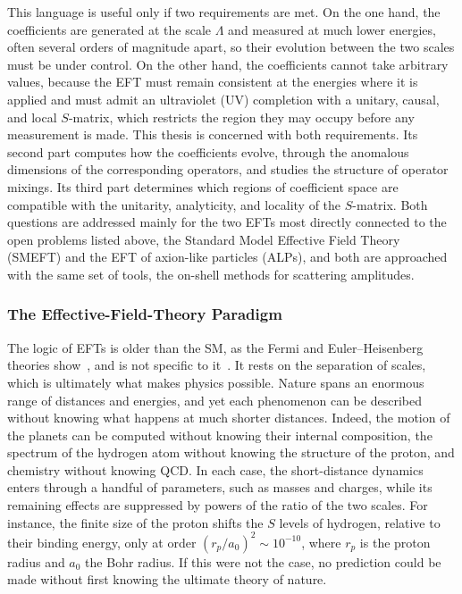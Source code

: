 This language is useful only if two requirements are met. On the one hand, the coefficients are
generated at the scale $\Lambda$ and measured at much lower energies, often several orders of
magnitude apart, so their evolution between the two scales must be under control. On the other hand,
the coefficients cannot take arbitrary values, because the EFT must remain consistent at the
energies where it is applied and must admit an ultraviolet (UV) completion with a unitary, causal, and local
$S$-matrix, which restricts the region they may occupy before any measurement is made. This thesis
is concerned with both requirements. Its second part computes how the coefficients evolve, through
the anomalous dimensions of the corresponding operators, and studies the structure of operator mixings. Its third part determines which regions of coefficient space are compatible
with the unitarity, analyticity, and locality of the $S$-matrix. Both questions are addressed mainly
for the two EFTs most directly connected to the open problems listed above, the Standard Model
Effective Field Theory (SMEFT) and the EFT of axion-like particles (ALPs), and both are approached
with the same set of tools, the on-shell methods for scattering amplitudes.

\subsubsection*{The Effective-Field-Theory Paradigm}

The logic of EFTs is older than the SM, as the Fermi and Euler--Heisenberg theories
show~\cite{Fermi:1934hr,Heisenberg:1936nmg}, and is not specific to
it~\cite{Weinberg:1978kz,Georgi:1993mps,Manohar:2018aog}. It rests on the separation of scales,
which is ultimately what makes physics possible. Nature spans an enormous range of distances and
energies, and yet each phenomenon can be described without knowing what happens at much shorter
distances. Indeed, the motion of the planets can be computed without knowing their internal
composition, the spectrum of the hydrogen atom without knowing the structure of the proton, and
chemistry without knowing QCD. In each case, the short-distance dynamics enters through a handful of
parameters, such as masses and charges, while its remaining effects are suppressed by powers of the
ratio of the two scales. For instance, the finite size of the proton shifts the $S$ levels of
hydrogen, relative to their binding energy, only at order $(r_p/a_0)^2\sim10^{-10}$, where $r_p$ is
the proton radius and $a_0$ the Bohr radius. If this were not the case, no prediction could be made
without first knowing the ultimate theory of nature. 


